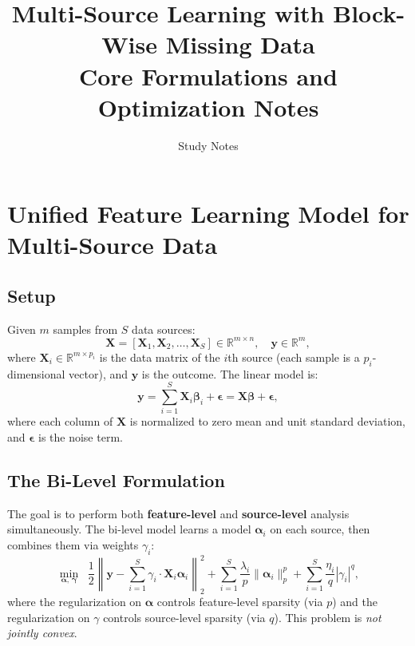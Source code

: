 \documentclass[11pt,a4paper]{article}
\title{Multi-Source Learning with Block-Wise Missing Data\\[6pt]
\large Core Formulations and Optimization Notes}
\author{Study Notes}
\date{}
\begin{document}
\maketitle

\section{Unified Feature Learning Model for Multi-Source Data}

\subsection{Setup}

Given $m$ samples from $S$ data sources:
\[
\mathbf{X} = [\mathbf{X}_1, \mathbf{X}_2, \ldots, \mathbf{X}_S] \in \mathbb{R}^{m \times n}, \quad \mathbf{y} \in \mathbb{R}^m,
\]
where $\mathbf{X}_i \in \mathbb{R}^{m \times p_i}$ is the data matrix of the $i$th source (each sample is a $p_i$-dimensional vector), and $\mathbf{y}$ is the outcome. The linear model is:
\begin{equation}
\mathbf{y} = \sum_{i=1}^{S} \mathbf{X}_i \boldsymbol{\beta}_i + \boldsymbol{\epsilon} = \mathbf{X}\boldsymbol{\beta} + \boldsymbol{\epsilon},
\end{equation}
where each column of $\mathbf{X}$ is normalized to zero mean and unit standard deviation, and $\boldsymbol{\epsilon}$ is the noise term.

\subsection{The Bi-Level Formulation}

The goal is to perform both \textbf{feature-level} and \textbf{source-level} analysis simultaneously. The bi-level model learns a model $\boldsymbol{\alpha}_i$ on each source, then combines them via weights $\gamma_i$:
\begin{equation}
\min_{\boldsymbol{\alpha},\,\boldsymbol{\gamma}} \;\;
\frac{1}{2}\left\|\mathbf{y} - \sum_{i=1}^{S} \gamma_i \cdot \mathbf{X}_i \boldsymbol{\alpha}_i \right\|_2^2
+ \sum_{i=1}^{S} \frac{\lambda_i}{p}\|\boldsymbol{\alpha}_i\|_p^p
+ \sum_{i=1}^{S} \frac{\eta_i}{q}|\gamma_i|^q,
\end{equation}
where the regularization on $\boldsymbol{\alpha}$ controls feature-level sparsity (via $p$) and the regularization on $\gamma$ controls source-level sparsity (via $q$). This problem is \emph{not jointly convex}.
\end{document}
